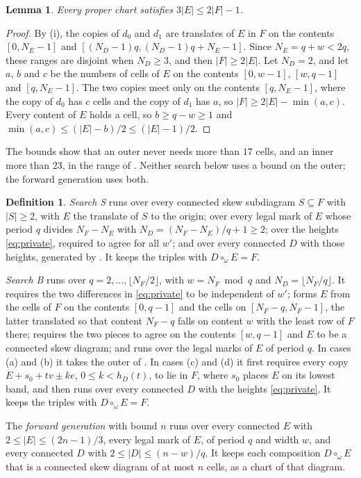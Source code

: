 \documentclass[11pt,a4paper]{amsart}
\numberwithin{equation}{section}
\theoremstyle{plain}
\newtheorem{lemma}[theorem]{Lemma}
\theoremstyle{definition}
\newtheorem{definition}[theorem]{Definition}
\begin{document}
\begin{lemma}\label{lem:inner-size}
Every proper chart satisfies \(3|E|\le2|F|-1\).
\end{lemma}

\begin{proof}
By (i), the copies of \(d_0\) and \(d_1\) are translates of \(E\) in \(F\) on the contents \([0,N_E-1]\) and \([(N_D-1)q,(N_D-1)q+N_E-1]\).  Since \(N_E=q+w<2q\), these ranges are disjoint when \(N_D\ge3\), and then \(|F|\ge2|E|\).  Let \(N_D=2\), and let \(a\), \(b\) and \(c\) be the numbers of cells of \(E\) on the contents \([0,w-1]\), \([w,q-1]\) and \([q,N_E-1]\).  The two copies meet only on the contents \([q,N_E-1]\), where the copy of \(d_0\) has \(c\) cells and the copy of \(d_1\) has \(a\), so \(|F|\ge2|E|-\min(a,c)\).  Every content of \(E\) holds a cell, so \(b\ge q-w\ge1\) and \(\min(a,c)\le(|E|-b)/2\le(|E|-1)/2\).
\end{proof}

The bounds show that an outer never needs more than \(17\) cells, and an inner more than \(23\), in the range of .  Neither search below uses a bound on the outer; the forward generation uses both.

\begin{definition}\label{def:searches}
\emph{Search S} runs over every connected skew subdiagram \(S\subseteq F\) with \(|S|\ge2\), with \(E\) the translate of \(S\) to the origin; over every legal mark of \(E\) whose period \(q\) divides \(N_F-N_E\) with \(N_D=(N_F-N_E)/q+1\ge2\); over the heights \eqref{eq:private}, required to agree for all \(w'\); and over every connected \(D\) with those heights, generated by .  It keeps the triples with \(D\circ_\omega E=F\).

\emph{Search B} runs over \(q=2,\ldots,\lfloor N_F/2\rfloor\), with \(w=N_F\bmod q\) and \(N_D=\lfloor N_F/q\rfloor\).  It requires the two differences in \eqref{eq:private} to be independent of \(w'\); forms \(E\) from the cells of \(F\) on the contents \([0,q-1]\) and the cells on \([N_F-q,N_F-1]\), the latter translated so that content \(N_F-q\) falls on content \(w\) with the least row of \(F\) there; requires the two pieces to agree on the contents \([w,q-1]\) and \(E\) to be a connected skew diagram; and runs over the legal marks of \(E\) of period \(q\).  In cases (a) and (b) it takes the outer of .  In cases (c) and (d) it first requires every copy \(E+s_0+tv\pm ke\), \(0\le k<h_D(t)\), to lie in \(F\), where \(s_0\) places \(E\) on its lowest band, and then runs over every connected \(D\) with the heights \eqref{eq:private}.  It keeps the triples with \(D\circ_\omega E=F\).

The \emph{forward generation} with bound \(n\) runs over every connected \(E\) with \(2\le|E|\le(2n-1)/3\), every legal mark of \(E\), of period \(q\) and width \(w\), and every connected \(D\) with \(2\le|D|\le(n-w)/q\).  It keeps each composition \(D\circ_\omega E\) that is a connected skew diagram of at most \(n\) cells, as a chart of that diagram.
\end{definition}
\end{document}
